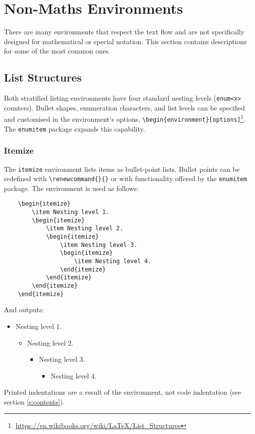 \chapter{Non-Maths Environments}
%
There are many environments that respect the text flow and are not
specifically designed for mathematical or special notation.  This
section contains descriptions for some of the most common ones.
%
\section{List Structures}
%
Both stratified listing environments have four standard nesting levels
(\verb|enum<x>| counters).  Bullet shapes, enumeration characters, and
list levels can be specified and customised in the environment's
options,
\verb|\begin{environment}[options]|\footnote{\url{https://en.wikibooks.org/wiki/LaTeX/List_Structures}}.
  The \verb|enumitem| package expands this capability.
%
\subsection{Itemize}
%
The \verb|itemize| environment lists items as bullet-point lists.
Bullet points can be redefined with \verb|\renewcommand{}{}| or with
functionality offered by the \verb|enumitem| package.  The environment
is used as follows:
\begin{verbatim}
	\begin{itemize}
    	\item Nesting level 1.
	    \begin{itemize}
    	    \item Nesting level 2.
        	\begin{itemize}
            	\item Nesting level 3.
	            \begin{itemize}
    	            \item Nesting level 4.
        	    \end{itemize}
	        \end{itemize}
	    \end{itemize}
	\end{itemize}
\end{verbatim}
And outputs:
\begin{itemize}
\item Nesting level 1.
  \begin{itemize}
  \item Nesting level 2.
    \begin{itemize}
    \item Nesting level 3.
      \begin{itemize}
      \item Nesting level 4.
      \end{itemize}
    \end{itemize}
  \end{itemize}
\end{itemize}
Printed indentations are a result of the environment, not code
indentation (see section \ref{s:contents}).
%
